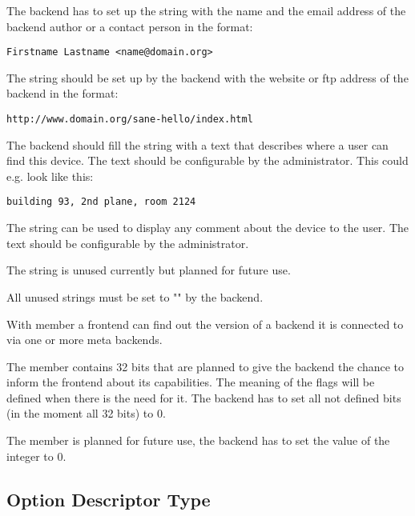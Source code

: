 \documentclass[11pt,DVIps]{report}
\begin{document}
\begin{changebar}
The backend has to set up the string 
with the name and the email address of the backend author or a contact person
in the format:
\begin{verbatim}
Firstname Lastname <name@domain.org>
\end{verbatim}

The string  should be set up by the backend
with the website or ftp address of the backend in the format:
\begin{verbatim}
http://www.domain.org/sane-hello/index.html
\end{verbatim}

The backend should fill the string  with a
text that describes where a user can find this device. The text 
should be configurable by the administrator. This could e.g. look
like this:
\begin{verbatim}
building 93, 2nd plane, room 2124
\end{verbatim}

The string  can be used to display any comment about the device
to the user. The text should be configurable by the administrator.

The string  is unused currently but planned for
future use.

All unused strings must be set to "" by the backend.

With member  a frontend can find
out the version of a backend it is connected to via one or more meta
backends.

The member  contains 32 bits that
are planned to give the backend the chance to inform the frontend about
its capabilities. The meaning of the flags will be defined when there
is the need for it. The backend has to set all not defined bits
(in the moment all 32 bits) to 0.

The member  is planned for future use, the backend has
to set the value of the integer to 0.
\end{changebar}

\subsection{Option Descriptor Type}\label{sec:odesc}
\end{document}
